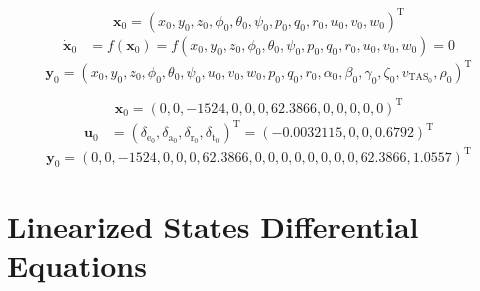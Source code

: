 \documentclass[lettersize,journal]{IEEEtran}
\begin{document}
{\begin{equation}
\bm{x_{\mathrm{0}}}=(x_{\mathrm{0}}, y_{\mathrm{0}}, z_{\mathrm{0}}, \phi_{\mathrm{0}}, \theta_{\mathrm{0}}, \psi_{\mathrm{0}}, p_{\mathrm{0}}, q_{\mathrm{0}}, r_{\mathrm{0}}, u_{\mathrm{0}}, v_{\mathrm{0}}, w_{\mathrm{0}})^{\mathrm{T}}
\end{equation}
\begin{equation}
\begin{aligned}
\bm{\dot{x}_{\mathrm{0}}}&=f\left(\bm{x_{\mathrm{0}}}\right)=f\left(x_{\mathrm{0}}, y_{\mathrm{0}}, z_{\mathrm{0}}, \phi_{\mathrm{0}}, \theta_{\mathrm{0}}, \psi_{\mathrm{0}}, p_{\mathrm{0}}, q_{\mathrm{0}}, r_{\mathrm{0}}, u_{\mathrm{0}}, v_{\mathrm{0}}, w_{\mathrm{0}}\right)=0
\end{aligned}
\end{equation}
\begin{equation}
\bm{y_{\mathrm{0}}}=(x_{\mathrm{0}}, y_{\mathrm{0}}, z_{\mathrm{0}}, \phi_{\mathrm{0}}, \theta_{\mathrm{0}}, \psi_{\mathrm{0}}, u_{\mathrm{0}}, v_{\mathrm{0}}, w_{\mathrm{0}}, p_{\mathrm{0}}, q_{\mathrm{0}}, r_{\mathrm{0}}, \alpha_{\mathrm{0}}, \beta_{\mathrm{0}}, \gamma_{\mathrm{0}}, \zeta_{\mathrm{0}}, v_{\mathrm{TAS}_{\mathrm{0}}}, \rho_{\mathrm{0}})^{\mathrm{T}}
\end{equation}

\begin{equation}
\bm{x_{\mathrm{0}}}=(0, 0, -1524, 0, 0, 0, 62.3866, 0, 0, 0, 0, 0)^{\mathrm{T}}
\end{equation}
\begin{equation}
\begin{aligned}
\bm{u_{\mathrm{0}}}&=(\delta_{\mathrm{e}_0}, \delta_{\mathrm{a}_0}, \delta_{\mathrm{r}_0}, \delta_{\mathrm{t}_0})^{\mathrm{T}}=(-0.0032115, 0, 0, 0.6792)^{\mathrm{T}}
\end{aligned}
\end{equation}
\begin{equation}
\bm{y_{\mathrm{0}}}=(0, 0, -1524, 0, 0, 0, 62.3866, 0, 0, 0, 0, 0, 0, 0, 0, 62.3866, 1.0557)^{\mathrm{T}}
\end{equation}

\vfill\null
\section{Linearized States Differential Equations}\label{apdx:linear_eqs}

}
\end{document}
